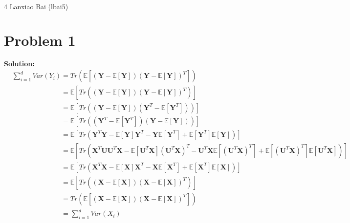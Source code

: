 \documentclass[11pt]{article}
\begin{document}
\homework
    {4}
    {Lanxiao Bai (lbai5)}
    {}

\section*{Problem 1}
\textbf{Solution:} 
	\begin{align}
		&\sum_{i = 1}^d Var(Y_i) = Tr(\mathbb{E}[(\mathbf{Y} - \mathbb{E}[\mathbf{Y}])(\mathbf{Y} - \mathbb{E}[\mathbf{Y}])^T])\nonumber\\
		&\phantom{\sum_{i = 1}^d Var(Y_i)} = \mathbb{E}[Tr((\mathbf{Y} - \mathbb{E}[\mathbf{Y}])(\mathbf{Y} - \mathbb{E}[\mathbf{Y}])^T)]\nonumber\\
		&\phantom{\sum_{i = 1}^d Var(Y_i)} = \mathbb{E}[Tr((\mathbf{Y} - \mathbb{E}[\mathbf{Y}])(\mathbf{Y}^T - \mathbb{E}[\mathbf{Y}^T]))]\nonumber\\
		&\phantom{\sum_{i = 1}^d Var(Y_i)} = \mathbb{E}[Tr((\mathbf{Y}^T - \mathbb{E}[\mathbf{Y}^T])(\mathbf{Y} - \mathbb{E}[\mathbf{Y}]))]\nonumber\\
		&\phantom{\sum_{i = 1}^d Var(Y_i)} = \mathbb{E}[Tr(\mathbf{Y}^T\mathbf{Y} - \mathbb{E}[\mathbf{Y}]\mathbf{Y}^T - \mathbf{Y}\mathbb{E}[\mathbf{Y}^T] + \mathbb{E}[\mathbf{Y}^T]\mathbb{E}[\mathbf{Y}])]\nonumber\\
		&\phantom{\sum_{i = 1}^d Var(Y_i)} = \mathbb{E}[Tr(\mathbf{X}^T\mathbf{U}\mathbf{U}^T\mathbf{X} - \mathbb{E}[\mathbf{U}^T\mathbf{X}](\mathbf{U}^T\mathbf{X})^T - \mathbf{U}^T\mathbf{X}\mathbb{E}[(\mathbf{U}^T\mathbf{X})^T] + \mathbb{E}[(\mathbf{U}^T\mathbf{X})^T]\mathbb{E}[\mathbf{U}^T\mathbf{X}])]\nonumber\\
		&\phantom{\sum_{i = 1}^d Var(Y_i)} = \mathbb{E}[Tr(\mathbf{X}^T\mathbf{X} - \mathbb{E}[\mathbf{X}]\mathbf{X}^T - \mathbf{X}\mathbb{E}[\mathbf{X}^T] + \mathbb{E}[\mathbf{X}^T]\mathbb{E}[\mathbf{X}])]\nonumber\\
		&\phantom{\sum_{i = 1}^d Var(Y_i)} = \mathbb{E}[Tr((\mathbf{X} - \mathbb{E}[\mathbf{X}])(\mathbf{X} - \mathbb{E}[\mathbf{X}])^T)]\nonumber\\
		&\phantom{\sum_{i = 1}^d Var(Y_i)} = Tr(\mathbb{E}[(\mathbf{X} - \mathbb{E}[\mathbf{X}])(\mathbf{X} - \mathbb{E}[\mathbf{X}])^T])\nonumber\\
		&\phantom{\sum_{i = 1}^d Var(Y_i)} = \sum_{i = 1}^d Var(X_i)\nonumber\\
	\end{align}
	
\end{document}
